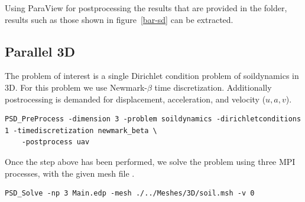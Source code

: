 Using ParaView for postprocessing the results that are provided in the  folder, results such as those shown in figure~\ref{bar-sd} can be extracted.


\subsection{Parallel 3D}

The problem of interest is a single Dirichlet condition problem of soildynamics in 3D. For this problem we use Newmark-$\beta$ time discretization. Additionally postrocessing is demanded for displacement, acceleration, and velocity ($u,a,v$).

\begin{lstlisting}[style=BashInputStyle]
	PSD_PreProcess -dimension 3 -problem soildynamics -dirichletconditions 1 -timediscretization newmark_beta \
	-postprocess uav
\end{lstlisting}

Once the step above has been performed, we solve the problem using three MPI processes, with the given mesh file . 

\begin{lstlisting}[style=BashInputStyle]
	PSD_Solve -np 3 Main.edp -mesh ./../Meshes/3D/soil.msh -v 0
\end{lstlisting}

